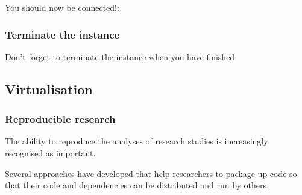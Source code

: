 You should now be connected!:

\begin{Shaded}
\begin{Highlighting}[]
       \KeywordTok{__|}  \KeywordTok{__|_}  \NormalTok{)}
       \KeywordTok{_|} \DataTypeTok{\textbackslash{}(}     \KeywordTok{/}   
      \KeywordTok{___|}\DataTypeTok{\textbackslash{}\textbackslash{}}\KeywordTok{___|___|}

\NormalTok{[} \NormalTok{~]$}
\end{Highlighting}
\end{Shaded}

\subsubsection{Terminate the instance}\label{terminate-the-instance}

Don't forget to terminate the instance when you have finished:

\begin{Shaded}
\begin{Highlighting}[]
\NormalTok{$ } \KeywordTok{<}\KeywordTok{>}

    
    
   
\end{Highlighting}
\end{Shaded}

\subsection{Virtualisation}\label{virtualisation}

\subsubsection{Reproducible research}\label{reproducible-research}

The ability to reproduce the analyses of research studies is
increasingly recognised as important.

Several approaches have developed that help researchers to package up
code so that their code and dependencies can be distributed and run by
others.

